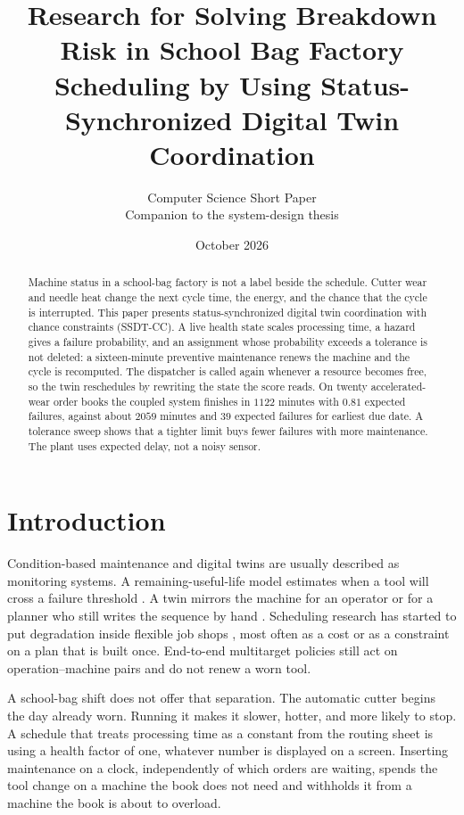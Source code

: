 \documentclass[10pt,a4paper]{article}
\title{\large Research for Solving Breakdown Risk in School Bag Factory Scheduling by Using Status-Synchronized Digital Twin Coordination}
\author{Computer Science Short Paper\\Companion to the system-design thesis}
\date{October 2026}
\begin{document}
\maketitle
\vspace{-1.6em}

\begin{abstract}
\noindent
Machine status in a school-bag factory is not a label beside the schedule. Cutter wear and needle heat change the next cycle time, the energy, and the chance that the cycle is interrupted. This paper presents status-synchronized digital twin coordination with chance constraints (SSDT-CC). A live health state scales processing time, a hazard gives a failure probability, and an assignment whose probability exceeds a tolerance is not deleted: a sixteen-minute preventive maintenance renews the machine and the cycle is recomputed. The dispatcher is called again whenever a resource becomes free, so the twin reschedules by rewriting the state the score reads. On twenty accelerated-wear order books the coupled system finishes in \(1122\) minutes with \(0.81\) expected failures, against about \(2059\) minutes and \(39\) expected failures for earliest due date. A tolerance sweep shows that a tighter limit buys fewer failures with more maintenance. The plant uses expected delay, not a noisy sensor.
\end{abstract}

\section{Introduction}

Condition-based maintenance and digital twins are usually described as monitoring systems. A remaining-useful-life model estimates when a tool will cross a failure threshold \cite{si2011,lei2018}. A twin mirrors the machine for an operator or for a planner who still writes the sequence by hand \cite{grieves2017,tao2019,lee2015}. Scheduling research has started to put degradation inside flexible job shops \cite{cbm2024}, most often as a cost or as a constraint on a plan that is built once. End-to-end multitarget policies \cite{wang2025} still act on operation--machine pairs and do not renew a worn tool.

A school-bag shift does not offer that separation. The automatic cutter begins the day already worn. Running it makes it slower, hotter, and more likely to stop. A schedule that treats processing time as a constant from the routing sheet is using a health factor of one, whatever number is displayed on a screen. Inserting maintenance on a clock, independently of which orders are waiting, spends the tool change on a machine the book does not need and withholds it from a machine the book is about to overload.
\end{document}
